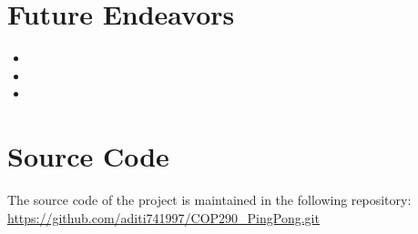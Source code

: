 \documentclass{article}
\begin{document}
	\section{Future Endeavors}
	\begin{itemize}
	\item
	\item
	\item
	\end{itemize}

	\section{Source Code}
	The source code of the project is maintained in the following repository: \\
	\url{https://github.com/aditi741997/COP290_PingPong.git}
	
	\medskip
	
\end{document}
